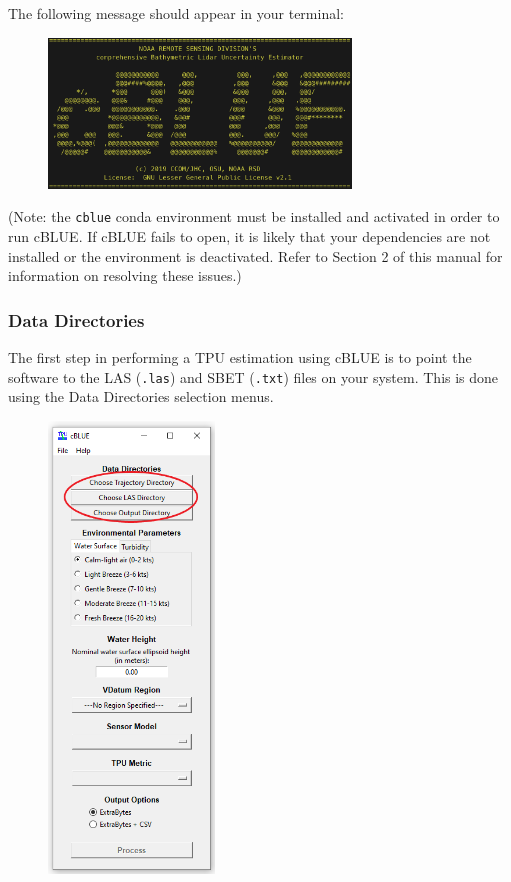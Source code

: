 \documentclass[11pt, a4paper]{article}
\begin{document}
\vspace{1em}

The following message should appear in your terminal:
\begin{figure}[H]
    \centering
    \includegraphics[height=4cm]{figs/cblue_term_logo.png}
\end{figure}

(Note: the \texttt{cblue} conda environment must be installed and activated in order to run cBLUE. If cBLUE fails to open, it is likely that your dependencies are not installed or the environment is deactivated. Refer to Section 2 of this manual for information on resolving these issues.)



\subsubsection{Data Directories}
The first step in performing a TPU estimation using cBLUE is to point the software to the LAS (\texttt{.las}) and SBET (\texttt{.txt}) files on your system. This is done using the Data Directories selection menus. 

\begin{figure}[H]
    \centering
    \includegraphics[height=12cm]{figs/cblue_gui_data_dir.png}
\end{figure}
\end{document}
